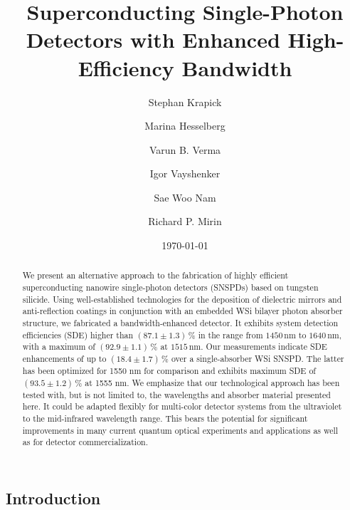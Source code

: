 \documentclass[aip,apl,showpacs,showkeys,preprint,superscriptaddress,preprintnumbers,amsmath,amssymb]{revtex4-1}
\begin{document}
\begin{bibunit}
\title{Superconducting Single-Photon Detectors with Enhanced High-Efficiency Bandwidth}
\author{Stephan Krapick}
\author{Marina Hesselberg}
\author{Varun B. Verma}
\author{Igor Vayshenker}
\author{Sae Woo Nam}
\author{Richard P. Mirin}
\date{\today}

\begin{abstract}
We present an alternative approach to the fabrication of highly efficient superconducting nanowire single-photon detectors (SNSPDs) based on tungsten silicide. Using well-established technologies for the deposition of dielectric mirrors and anti-reflection coatings in conjunction with an embedded WSi bilayer photon absorber structure, we fabricated a bandwidth-enhanced detector. It exhibits system detection efficiencies (SDE) higher than $\left(87.1\pm1.3\right)\,\%$ in the range from $1450\,\mathrm{nm}$ to $1640\,\mathrm{nm}$, with a maximum of $\left(92.9\pm1.1\right)\,\%$ at $1515\,\mathrm{nm}$. Our measurements indicate SDE enhancements of up to $\left(18.4\pm1.7\right)\,\%$ over a single-absorber WSi SNSPD. The latter has been optimized for 1550 nm for comparison and exhibits maximum SDE of $\left(93.5\pm1.2\right)\,\%$ at 1555 nm. We emphasize that our technological approach has been tested with, but is not limited to, the wavelengths and absorber material presented here. It could be adapted flexibly for multi-color detector systems from the ultraviolet to the mid-infrared wavelength range. This bears the potential for significant improvements in many current quantum optical experiments and applications as well as for detector commercialization.
\end{abstract}


\maketitle

\section{Introduction}


\end{bibunit}
\end{document}
